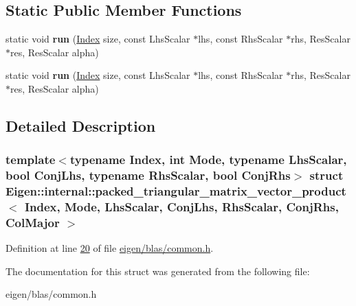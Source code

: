 \subsection*{Static Public Member Functions}
\begin{DoxyCompactItemize}
\item 
\mbox{\label{struct_eigen_1_1internal_1_1packed__triangular__matrix__vector__product_3_01_index_00_01_mode_00bec3a0963b0a27d1079bfcbb3d0202cf_a522b18c1dd03d9cae594ca625ca9b1b3}} 
static void {\bfseries run} (\hyperlink{namespace_eigen_a62e77e0933482dafde8fe197d9a2cfde}{Index} size, const Lhs\+Scalar $\ast$lhs, const Rhs\+Scalar $\ast$rhs, Res\+Scalar $\ast$res, Res\+Scalar alpha)
\item 
\mbox{\label{struct_eigen_1_1internal_1_1packed__triangular__matrix__vector__product_3_01_index_00_01_mode_00bec3a0963b0a27d1079bfcbb3d0202cf_a522b18c1dd03d9cae594ca625ca9b1b3}} 
static void {\bfseries run} (\hyperlink{namespace_eigen_a62e77e0933482dafde8fe197d9a2cfde}{Index} size, const Lhs\+Scalar $\ast$lhs, const Rhs\+Scalar $\ast$rhs, Res\+Scalar $\ast$res, Res\+Scalar alpha)
\end{DoxyCompactItemize}


\subsection{Detailed Description}
\subsubsection*{template$<$typename Index, int Mode, typename Lhs\+Scalar, bool Conj\+Lhs, typename Rhs\+Scalar, bool Conj\+Rhs$>$\newline
struct Eigen\+::internal\+::packed\+\_\+triangular\+\_\+matrix\+\_\+vector\+\_\+product$<$ Index, Mode, Lhs\+Scalar, Conj\+Lhs, Rhs\+Scalar, Conj\+Rhs, Col\+Major $>$}



Definition at line \hyperlink{eigen_2blas_2common_8h_source_l00020}{20} of file \hyperlink{eigen_2blas_2common_8h_source}{eigen/blas/common.\+h}.



The documentation for this struct was generated from the following file\+:\begin{DoxyCompactItemize}
\item 
eigen/blas/common.\+h\end{DoxyCompactItemize}
